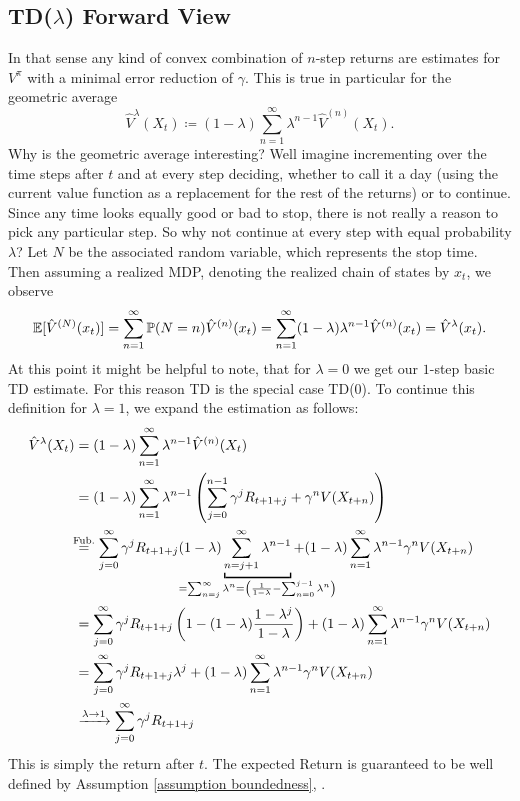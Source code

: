 \subsection{TD(\(\lambda\)) Forward View}
In that sense any kind of convex combination of \(n\)-step returns are estimates for \(V^\pi\) with a minimal error reduction of \(\gamma\). This is true in particular for the geometric average
\[
	\hat{V}^\lambda(X_t)\coloneqq (1-\lambda)\sum_{n=1}^\infty \lambda^{n-1} \hat{V}^{(n)}(X_t).
\]
Why is the geometric average interesting? Well imagine incrementing over the time steps after \(t\) and at every step deciding, whether to call it a day (using the current value function as a replacement for the rest of the returns) or to continue. Since any time looks equally good or bad to stop, there is not really a reason to pick any particular step. So why not continue at every step with equal probability \(\lambda\)? Let \(N\) be the associated random variable, which represents the stop time. Then assuming a realized MDP, denoting the realized chain of states by \(x_t\), we observe
\[
	\mathbb{E}[\hat{V}^{(N)}(x_t)]=\sum_{n=1}^\infty \mathbb{P}(N=n) \hat{V}^{(n)}(x_t) 
	=\sum_{n=1}^\infty (1-\lambda)\lambda^{n-1} \hat{V}^{(n)}(x_t)=\hat{V}^\lambda (x_t).
\]
At this point it might be helpful to note, that for \(\lambda=0\) we get our \(1\)-step basic TD estimate. For this reason TD is the special case TD(\(0\)). To continue this definition for \(\lambda=1\), we expand the estimation as follows:
\begin{align}
	\hat{V}^\lambda(X_t)&=(1-\lambda)\sum_{n=1}^\infty \lambda^{n-1} \hat{V}^{(n)}(X_t)
	\nonumber\\
	&=(1-\lambda)\sum_{n=1}^\infty \lambda^{n-1}
	\left(
		\sum_{j=0}^{n-1}\gamma^j R_{t+1+j} + \gamma^n V(X_{t+n})
	\right)
	\nonumber\\
	&\lxeq{\text{Fub.}}\sum_{j=0}^\infty \gamma^j R_{t+1+j} 
	(1-\lambda)\underbracket[1pt]{\sum_{n=j+1}^\infty \lambda^{n-1}}_{
		\mathclap{=\sum_{n=j}^\infty \lambda^n = \left(\frac{1}{1-\lambda} - \sum_{n=0}^{j-1}\lambda^n\right)}
	}
	+ (1-\lambda) \sum_{n=1}^\infty \lambda^{n-1}\gamma^n V(X_{t+n})
	\nonumber\\
	&=\sum_{j=0}^\infty \gamma^j R_{t+1+j} 
	\left(1- (1-\lambda)\frac{1-\lambda^j}{1-\lambda} \right) 
	+ (1-\lambda)\sum_{n=1}^\infty \lambda^{n-1}\gamma^n V(X_{t+n})
	\nonumber\\
	&=\sum_{j=0}^\infty \gamma^j R_{t+1+j} \lambda^j 
	+ (1-\lambda)\sum_{n=1}^\infty \lambda^{n-1}\gamma^n V(X_{t+n})
	\label{tangent backward view}\\
	&\xrightarrow{\lambda \to 1} \sum_{j=0}^\infty \gamma^j R_{t+1+j}
	\nonumber
\end{align}
This is simply the return after \(t\). The expected Return is guaranteed to be well defined by Assumption \ref{assumption boundedness}, .

